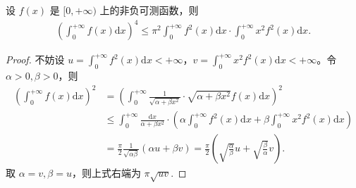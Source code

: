 \documentclass[../../main.tex]{subfiles}%
\begin{document}
\begin{example}
设 $f(x)$ 是 $[0, +\infty)$ 上的非负可测函数，则
\begin{align*}
\left( \int_0^{+\infty} f(x) \mathrm{d}x \right)^4 \leqslant \pi^2 \int_0^{+\infty} f^2(x) \mathrm{d}x \cdot \int_0^{+\infty} x^2 f^2(x) \mathrm{d}x.
\end{align*}
\end{example}
\begin{proof}

不妨设 $u = \int_0^{+\infty} f^2(x) \mathrm{d}x < +\infty$，$v = \int_0^{+\infty} x^2 f^2(x) \mathrm{d}x < +\infty$。令 $\alpha > 0, \beta > 0$，则
\begin{align*}
\left( \int_0^{+\infty} f(x) \mathrm{d}x \right)^2 &= \left( \int_0^{+\infty} \frac{1}{\sqrt{\alpha + \beta x^2}} \cdot \sqrt{\alpha + \beta x^2} f(x) \mathrm{d}x \right)^2 \\
&\leqslant \int_0^{+\infty} \frac{\mathrm{d}x}{\alpha + \beta x^2} \cdot \left( \alpha \int_0^{+\infty} f^2(x) \mathrm{d}x + \beta \int_0^{+\infty} x^2 f^2(x) \mathrm{d}x \right) \\
&= \frac{\pi}{2} \frac{1}{\sqrt{\alpha\beta}} (\alpha u + \beta v) = \frac{\pi}{2} \left( \sqrt{\frac{\alpha}{\beta}} u + \sqrt{\frac{\beta}{\alpha}} v \right).
\end{align*}
取 $\alpha = v, \beta = u$，则上式右端为 $\pi \sqrt{uv}$.

\end{proof}
\end{document}

